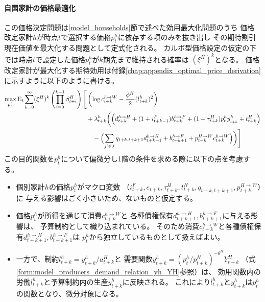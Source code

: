 \paragraph{自国家計の価格最適化}
\label{sec:model_producers_optimization_home}
この価格決定問題は\ref{model_households}節で述べた効用最大化問題のうち
価格改定家計\(h\)が時点\(t\)で選択する価格\(p_t^h\)に依存する項のみを抜き出し
その期待割引現在価値を最大化する問題として定式化される。
カルボ型価格設定の仮定の下では時点\(t\)で設定した価格\(p_t^h\)が\(k\)期先まで維持される確率は
\((\xi^H)^k\)となる。
価格改定家計が最大化する期待効用は付録\ref{chap:appendix_optimal_price_derivation}
に示すように以下のように書ける。
\begin{equation}
\label{form:model_producers_optimization_home_lagrangian_def}
    \begin{aligned}
        \max_{p_t^h}\operatorname{E}_t\sum_{k=0}^{\infty}(\xi^H)^k\left(\prod_{i=0}^{k-1}\beta_{t+i}^H\right)\Biggl[&\left(\log c_{t+k}^{h\to W}-\frac{\phi^H}{2}(l_{t+k}^h)^2\right) \\
        &+\lambda_{t+k}^h\biggl(\Bigl(d_{t+k}^{h\to H}+(1+i_{t+k-1}^F)b_{t+k}^{h\to F}+(1-\tau_{t+k}^H)p_t^hy_{_{t+k}}^h+t_{t+k}^H\Bigr) \\
        &\quad-\Bigl(\sum_{j'\in J}q_{t+k,t+k+1}d_{t+k+1}^{h\to H}+b_{t+k+1}^{h\to F}+p_{t+k}^{H\to W}c_{t+k}^{h\to W}\Bigr)\biggr)\Biggr]
    \end{aligned}
\end{equation}
この目的関数を\(p_t^h\)について偏微分し1階の条件を求める際に以下の点を考慮する。
\begin{itemize}
    \item
    \label{itm:model_producers_optimization_home_assumption1}
        個別家計\(h\)の価格\(p_t^h\)がマクロ変数
        （\(i_{t+k}^F,e_{t+k},\tau_{t+k}^H,t_{t+k}^H,q_{t+k,t+k+1},p_{t+k}^{H\to W}\)）に
        与える影響はごく小さいため、ないものと仮定する。
    \item
    \label{itm:model_producers_optimization_home_assumption2}
        価格\(p_t^h\)が所得を通じて消費\(c_{t+k}^{h\to W}\)と
        各種債権保有\(d_{t+k+1}^{h\to H},b_{t+k+1}^{h\to F}\)に与える影響は、
        予算制約として織り込まれている。
        そのため消費\(c_{t+k}^{h\to W}\)と各種債権保有\(d_{t+k+1}^{h\to H},b_{t+k+1}^{h\to F}\)は
        \(p_t^h\)から独立しているものとして扱えばよい。
    \item
    \label{itm:model_producers_optimization_home_assumption3}
        一方で、制約\(l_{t+k}^h=y_{t+k}^h/a_{t+k}^H\)と
        需要関数\(y_{t+k}^h=(p_t^h/p_{t+k}^H)^{-\theta^H}Y_{t+k}^H\)
        （式\eqref{form:model_producers_demand_relation_yh_YH}参照）は、
        効用関数内の労働\(l_{t+k}^h\)と予算制約内の生産\(y_{t+k}^h\)に反映される。
        これにより\(l_{t+k}^h\)と\(y_{t+k}^h\)は\(p_t^h\)の関数となり、微分対象になる。
\end{itemize}
